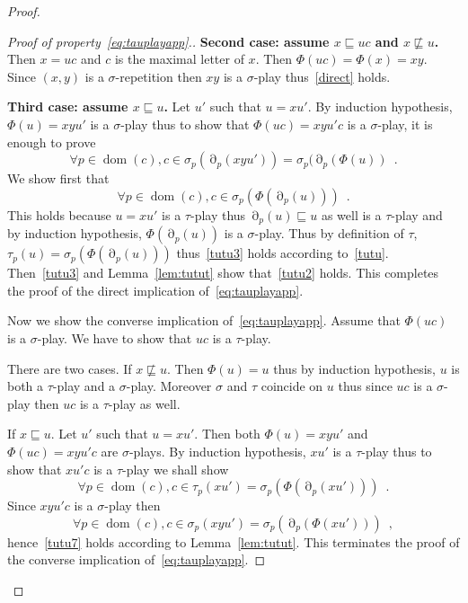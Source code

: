 \documentclass[a4paper,UKenglish]{lipics-v2016}
\newcommand{\pref}{\sqsubseteq}
\DeclareMathOperator{\dom}{dom}
\DeclareMathOperator{\view}{\partial}
\begin{document}
\begin{proof}
\begin{proof}[Proof of property~\eqref{eq:tauplayapp}.]
{\bf Second case: assume $x \pref uc$ and $x \not\pref u$.} Then $x=uc$ and $c$ is the maximal letter of $x$. Then $\Phi(uc)=\Phi(x)=xy$. Since $(x,y)$ is a $\sigma$-repetition then $xy$ is a $\sigma$-play thus~\eqref{direct} holds.

{\bf Third case: assume $x \pref u$.} Let $u'$ such that $u=xu'$.
By induction hypothesis, $\Phi(u)=xyu'$ is a $\sigma$-play thus to show that
$\Phi(uc)=xyu'c$ is a $\sigma$-play, it is enough to prove
\begin{equation}
\label{tutu2}
\forall p \in\dom(c), c \in \sigma_p(\view_p(xyu'))=\sigma_p(\view_p(\Phi(u))\enspace.
\end{equation}
We show first that
\begin{equation}
\label{tutu3}
\forall p \in\dom(c), c\in \sigma_p(\Phi(\view_p(u)))\enspace.
\end{equation}
This holds because $u=xu'$ is a $\tau$-play thus $\view_p(u)\pref u$ as well
is a $\tau$-play
and by induction hypothesis, $\Phi(\view_p(u))$ is a $\sigma$-play.
Thus by definition of $\tau$,
$\tau_p(u) = \sigma_p(\Phi(\view_p(u)))$
thus~\eqref{tutu3} holds according to~\eqref{tutu}.
Then~\eqref{tutu3} and Lemma~\ref{lem:tutut} show that~\eqref{tutu2} holds.  
This completes the proof of the direct implication of~\eqref{eq:tauplayapp}.

\medskip

Now we show the converse implication of~\eqref{eq:tauplayapp}.
Assume that $\Phi(uc)$ is a $\sigma$-play.
We have to show that $uc$ is a $\tau$-play.

There are two cases.
If $x \not \pref u$.
Then $\Phi(u)=u$ thus by induction hypothesis,
$u$ is both a $\tau$-play and a $\sigma$-play.
Moreover $\sigma$ and $\tau$ coincide on $u$ thus 
since $uc$ is a $\sigma$-play then $uc$ is a $\tau$-play as well.

If $x \pref u$. Let $u'$ such that $u=xu'$.
Then both $\Phi(u)=xyu'$ and $\Phi(uc)=xyu'c$ are $\sigma$-plays.
By induction hypothesis,
$xu'$ is a $\tau$-play thus to show that $xu'c$ is a $\tau$-play we shall show
\begin{equation}\label{tutu7}
\forall p \in\dom(c),
c\in\tau_p(xu')=\sigma_p(\Phi(\view_p(xu')))\enspace.
\end{equation}
Since $xyu'c$ is a $\sigma$-play then
\[
\forall p \in\dom(c),
c\in\sigma_p(xyu')=\sigma_p(\view_p(\Phi(xu')))\enspace,
\]
hence~\eqref{tutu7} holds according to Lemma~\ref{lem:tutut}.
This terminates the proof of the converse implication of~\eqref{eq:tauplayapp}.
\end{proof}


\end{proof}
\end{document}
